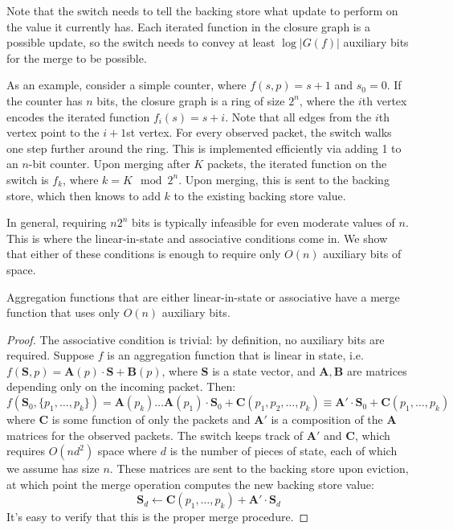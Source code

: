 Note that the switch needs to tell the backing store what update to perform on the value it currently has. Each iterated function in the closure graph is a possible update, so the switch needs to convey at least $\log |G(f)|$ auxiliary bits for the merge to be possible.

As an example, consider a simple counter, where $f(s, p) = s + 1$ and $s_0 = 0$. If the counter has $n$ bits, the closure graph is a ring of size $2^n$, where the $i$th vertex encodes the iterated function $f_i(s) = s + i$. Note that all edges from the $i$th vertex point to the $i+1$st vertex. For every observed packet, the switch walks one step further around the ring. This is implemented efficiently via adding 1 to an $n$-bit counter. Upon merging after $K$ packets, the iterated function on the switch is $f_{k}$, where $k = K \mod 2^n$. Upon merging, this is sent to the backing store, which then knows to add $k$ to the existing backing store value.

In general, requiring $n2^n$ bits is typically infeasible for even moderate values of $n$. This is where the linear-in-state and associative conditions come in. We show that either of these conditions is enough to require only $O(n)$ auxiliary bits of space.

\begin{theorem}
 Aggregation functions that are either linear-in-state or associative have a merge function that uses only $O(n)$ auxiliary bits.
\end{theorem}
\begin{proof}
The associative condition is trivial: by definition, no auxiliary bits are required. 
Suppose $f$ is an aggregation function that is linear in state, i.e. $f(\mathbf{S}, p) = \mathbf{A}(p) \cdot \mathbf{S} + \mathbf{B}(p)$, where $\mathbf{S}$ is a state vector, and $\mathbf{A,B}$ are matrices depending only on the incoming packet. Then:
\[ f(\mathbf{S}_0, \{p_1, \ldots, p_k\}) = \mathbf{A}(p_k)\ldots \mathbf{A}(p_1) \cdot \mathbf{S}_0 + \mathbf{C}(p_1, p_2, \ldots, p_k) \equiv \mathbf{A'} \cdot \mathbf{S}_0 + \mathbf{C}(p_1, \ldots, p_k)\]
where $\mathbf{C}$ is some function of only the packets and $\mathbf{A'}$ is a composition of the $\mathbf{A}$ matrices for the observed packets. The switch keeps track of $\mathbf{A'}$ and $\mathbf{C}$, which requires $O(nd^2)$ space where $d$ is the number of pieces of state, each of which we assume has size $n$. These matrices are sent to the backing store upon eviction, at which point the merge operation computes the new backing store value:
\[ \mathbf{S}_d \leftarrow \mathbf{C}(p_1, \ldots, p_k) + \mathbf{A'} \cdot \mathbf{S}_d \]
It's easy to verify that this is the proper merge procedure.
\end{proof}

